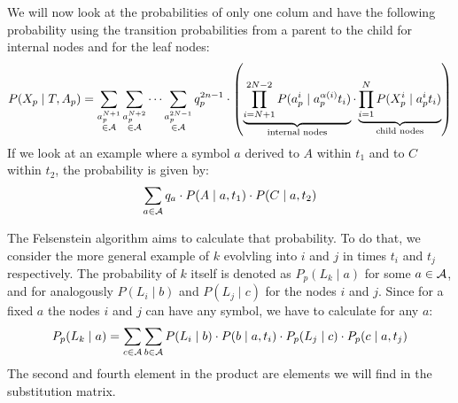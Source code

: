 We will now look at the probabilities of only one colum and have the following
probability using the transition probabilities from a parent to the child for
internal nodes and for the leaf nodes:
\[
  P(X_p \mid T, A_p) = \sum_{\substack{a_p^{N+1}\\\in\mathcal{A}}} \sum_{\substack{a_p^{N+2}\\\in\mathcal{A}}} \dotsb \sum_{\substack{a_p^{2N-1}\\\in\mathcal{A}}}
      q_p^{2n-1} \cdot \left(
      \underbrace{\prod_{i=N+1}^{2N-2} P(a_p^i \mid a_p^{\alpha(i)} t_i)}_{\text{internal nodes}} \cdot
      \underbrace{\prod_{i=1}^{N}      P(X_p^i \mid a_p^i           t_i)}_{\text{child nodes}} \right)
\]
If we look at an example where a symbol \(a\) derived to \(A\) within \(t_1\)
and to \(C\) within \(t_2\), the probability is given by:
\[
  \sum_{a\in\mathcal{A}} q_a \cdot P(A \mid a, t_1) \cdot P(C \mid a, t_2)
\]

The Felsenstein algorithm aims to calculate that probability.  To do that, we
consider the more general example of \(k\) evolvling into \(i\) and \(j\) in
times \(t_i\) and \(t_j\) respectively.  The probability of \(k\) itself is
denoted as \(P_p(L_k \mid a)\) for some \(a\in\mathcal{A}\), and for analogously
\(P(L_i \mid b)\) and \(P(L_j \mid c)\) for the nodes \(i\) and \(j\).  Since
for a fixed \(a\) the nodes \(i\) and \(j\) can have any symbol, we have to
calculate for any \(a\):
\[
  P_p(L_k \mid a) = \sum_{c\in\mathcal{A}} \sum_{b\in\mathcal{A}}
      P(L_i \mid b) \cdot P(b \mid a, t_i) \cdot P_p(L_j \mid c) \cdot P_p(c \mid a, t_j)
\]
The second and fourth element in the product are elements we will find in the
substitution matrix.


